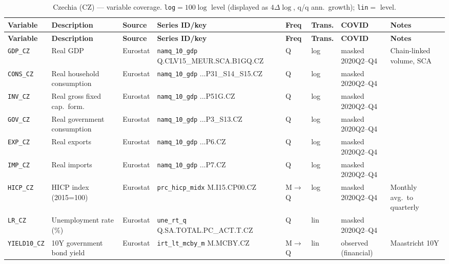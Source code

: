 {\footnotesize
\begin{longtable}{@{}p{2.0cm}p{2.7cm}p{1.4cm}p{2.8cm}p{0.7cm}p{0.85cm}p{1.5cm}p{2.3cm}@{}}
\caption{Czechia (CZ) --- variable coverage.  \texttt{log}$=100\log$ level
(displayed as $4\Delta\log$, q/q ann.\ growth); \texttt{lin}$=$ level.}
\label{tab:data:CZ}\\
\toprule
\textbf{Variable} & \textbf{Description} & \textbf{Source} & \textbf{Series ID/key} & \textbf{Freq} & \textbf{Trans.} & \textbf{COVID} & \textbf{Notes} \\
\midrule \endfirsthead
\toprule
\textbf{Variable} & \textbf{Description} & \textbf{Source} & \textbf{Series ID/key} & \textbf{Freq} & \textbf{Trans.} & \textbf{COVID} & \textbf{Notes} \\
\midrule \endhead
\bottomrule \endfoot
\texttt{GDP\_CZ}    & Real GDP                      & Eurostat & \texttt{namq\_10\_gdp} Q.\allowbreak CLV15\_MEUR.\allowbreak SCA.\allowbreak B1GQ.\allowbreak CZ        & Q & log & masked 2020Q2--Q4 & Chain-linked volume, SCA \\
\texttt{CONS\_CZ}   & Real household consumption    & Eurostat & \texttt{namq\_10\_gdp} ...P31\_S14\_S15.CZ              & Q & log & masked 2020Q2--Q4 & \\
\texttt{INV\_CZ}    & Real gross fixed cap.\ form.  & Eurostat & \texttt{namq\_10\_gdp} ...P51G.CZ                       & Q & log & masked 2020Q2--Q4 & \\
\texttt{GOV\_CZ}    & Real government consumption   & Eurostat & \texttt{namq\_10\_gdp} ...P3\_S13.CZ                    & Q & log & masked 2020Q2--Q4 & \\
\texttt{EXP\_CZ}    & Real exports                  & Eurostat & \texttt{namq\_10\_gdp} ...P6.CZ                         & Q & log & masked 2020Q2--Q4 & \\
\texttt{IMP\_CZ}    & Real imports                  & Eurostat & \texttt{namq\_10\_gdp} ...P7.CZ                         & Q & log & masked 2020Q2--Q4 & \\
\texttt{HICP\_CZ}   & HICP index (2015=100)         & Eurostat & \texttt{prc\_hicp\_midx} M.I15.CP00.CZ                  & M$\to$Q & log & masked 2020Q2--Q4 & Monthly avg.\ to quarterly \\
\texttt{LR\_CZ}     & Unemployment rate (\%)        & Eurostat & \texttt{une\_rt\_q} Q.SA.TOTAL.PC\_ACT.T.CZ             & Q & lin & masked 2020Q2--Q4 & \\
\texttt{YIELD10\_CZ}& 10Y government bond yield     & Eurostat & \texttt{irt\_lt\_mcby\_m} M.MCBY.CZ                     & M$\to$Q & lin & observed (financial) & Maastricht 10Y \\

\end{longtable}}
